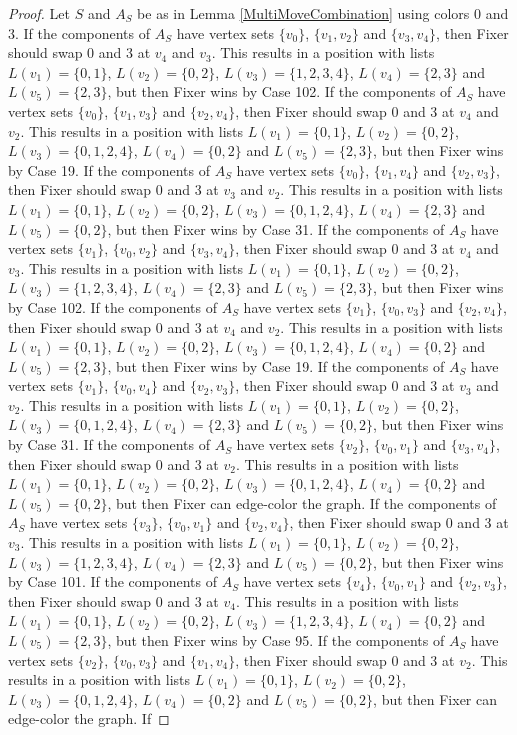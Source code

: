 \documentclass[12pt]{amsart}
\theoremstyle{plain}
\theoremstyle{definition}
\theoremstyle{remark}
\begin{document}
\begin{proof}
Let $S$ and $A_S$ be as in Lemma \ref{MultiMoveCombination} using colors $0$ and $3$. If the components of $A_S$ have vertex sets $\{v_0\}$, $\{v_1, v_2\}$ and $\{v_3, v_4\}$, then Fixer should swap 0 and 3 at $v_4$ and $v_3$. This results in a position with lists $L(v_1) = \{0, 1\}$, $L(v_2) = \{0, 2\}$, $L(v_3) = \{1, 2, 3, 4\}$, $L(v_4) = \{2, 3\}$ and $L(v_5) = \{2, 3\}$, but then Fixer wins by Case 102. If the components of $A_S$ have vertex sets $\{v_0\}$, $\{v_1, v_3\}$ and $\{v_2, v_4\}$, then Fixer should swap 0 and 3 at $v_4$ and $v_2$. This results in a position with lists $L(v_1) = \{0, 1\}$, $L(v_2) = \{0, 2\}$, $L(v_3) = \{0, 1, 2, 4\}$, $L(v_4) = \{0, 2\}$ and $L(v_5) = \{2, 3\}$, but then Fixer wins by Case 19. If the components of $A_S$ have vertex sets $\{v_0\}$, $\{v_1, v_4\}$ and $\{v_2, v_3\}$, then Fixer should swap 0 and 3 at $v_3$ and $v_2$. This results in a position with lists $L(v_1) = \{0, 1\}$, $L(v_2) = \{0, 2\}$, $L(v_3) = \{0, 1, 2, 4\}$, $L(v_4) = \{2, 3\}$ and $L(v_5) = \{0, 2\}$, but then Fixer wins by Case 31. If the components of $A_S$ have vertex sets $\{v_1\}$, $\{v_0, v_2\}$ and $\{v_3, v_4\}$, then Fixer should swap 0 and 3 at $v_4$ and $v_3$. This results in a position with lists $L(v_1) = \{0, 1\}$, $L(v_2) = \{0, 2\}$, $L(v_3) = \{1, 2, 3, 4\}$, $L(v_4) = \{2, 3\}$ and $L(v_5) = \{2, 3\}$, but then Fixer wins by Case 102. If the components of $A_S$ have vertex sets $\{v_1\}$, $\{v_0, v_3\}$ and $\{v_2, v_4\}$, then Fixer should swap 0 and 3 at $v_4$ and $v_2$. This results in a position with lists $L(v_1) = \{0, 1\}$, $L(v_2) = \{0, 2\}$, $L(v_3) = \{0, 1, 2, 4\}$, $L(v_4) = \{0, 2\}$ and $L(v_5) = \{2, 3\}$, but then Fixer wins by Case 19. If the components of $A_S$ have vertex sets $\{v_1\}$, $\{v_0, v_4\}$ and $\{v_2, v_3\}$, then Fixer should swap 0 and 3 at $v_3$ and $v_2$. This results in a position with lists $L(v_1) = \{0, 1\}$, $L(v_2) = \{0, 2\}$, $L(v_3) = \{0, 1, 2, 4\}$, $L(v_4) = \{2, 3\}$ and $L(v_5) = \{0, 2\}$, but then Fixer wins by Case 31. If the components of $A_S$ have vertex sets $\{v_2\}$, $\{v_0, v_1\}$ and $\{v_3, v_4\}$, then Fixer should swap 0 and 3 at $v_2$. This results in a position with lists $L(v_1) = \{0, 1\}$, $L(v_2) = \{0, 2\}$, $L(v_3) = \{0, 1, 2, 4\}$, $L(v_4) = \{0, 2\}$ and $L(v_5) = \{0, 2\}$, but then Fixer can edge-color the graph. If the components of $A_S$ have vertex sets $\{v_3\}$, $\{v_0, v_1\}$ and $\{v_2, v_4\}$, then Fixer should swap 0 and 3 at $v_3$. This results in a position with lists $L(v_1) = \{0, 1\}$, $L(v_2) = \{0, 2\}$, $L(v_3) = \{1, 2, 3, 4\}$, $L(v_4) = \{2, 3\}$ and $L(v_5) = \{0, 2\}$, but then Fixer wins by Case 101. If the components of $A_S$ have vertex sets $\{v_4\}$, $\{v_0, v_1\}$ and $\{v_2, v_3\}$, then Fixer should swap 0 and 3 at $v_4$. This results in a position with lists $L(v_1) = \{0, 1\}$, $L(v_2) = \{0, 2\}$, $L(v_3) = \{1, 2, 3, 4\}$, $L(v_4) = \{0, 2\}$ and $L(v_5) = \{2, 3\}$, but then Fixer wins by Case 95. If the components of $A_S$ have vertex sets $\{v_2\}$, $\{v_0, v_3\}$ and $\{v_1, v_4\}$, then Fixer should swap 0 and 3 at $v_2$. This results in a position with lists $L(v_1) = \{0, 1\}$, $L(v_2) = \{0, 2\}$, $L(v_3) = \{0, 1, 2, 4\}$, $L(v_4) = \{0, 2\}$ and $L(v_5) = \{0, 2\}$, but then Fixer can edge-color the graph. If 
\end{proof}
\end{document}
